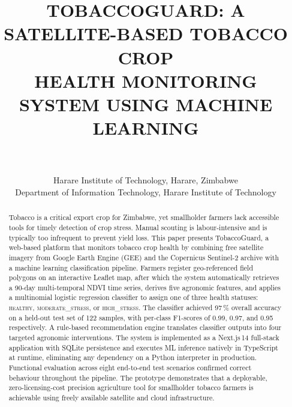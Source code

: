 \documentclass[conference]{IEEEtran}
\begin{document}
\title{TOBACCOGUARD: A SATELLITE-BASED TOBACCO CROP\\
HEALTH MONITORING SYSTEM USING MACHINE LEARNING}

\author{
  \\[2pt]
  \\[2pt]
  Harare Institute of Technology, Harare, Zimbabwe\\
  Department of Information Technology, Harare Institute of Technology
}

\maketitle

\begin{abstract}
Tobacco is a critical export crop for Zimbabwe, yet smallholder farmers
lack accessible tools for timely detection of crop stress. Manual scouting
is labour-intensive and is typically too infrequent to prevent yield loss.
This paper presents TobaccoGuard, a web-based platform that monitors
tobacco crop health by combining free satellite imagery from Google Earth
Engine (GEE) and the Copernicus Sentinel-2 archive with a machine
learning classification pipeline. Farmers register geo-referenced field
polygons on an interactive Leaflet map, after which the system
automatically retrieves a 90-day multi-temporal NDVI time series,
derives five agronomic features, and applies a multinomial logistic
regression classifier to assign one of three health statuses:
\textsc{healthy}, \textsc{moderate\_stress}, or \textsc{high\_stress}.
The classifier achieved 97\,\% overall accuracy on a held-out test set
of 122 samples, with per-class F1-scores of 0.99, 0.97, and 0.95
respectively. A rule-based recommendation engine translates classifier
outputs into four targeted agronomic interventions. The system is
implemented as a Next.js\,14 full-stack application with SQLite
persistence and executes ML inference natively in TypeScript at runtime,
eliminating any dependency on a Python interpreter in production.
Functional evaluation across eight end-to-end test scenarios confirmed
correct behaviour throughout the pipeline. The prototype demonstrates
that a deployable, zero-licensing-cost precision agriculture tool for
smallholder tobacco farmers is achievable using freely available
satellite and cloud infrastructure.
\end{abstract}
\end{document}
